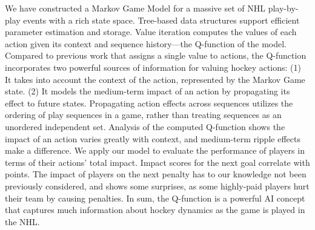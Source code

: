 \documentclass[]{article}
\begin{document}
We have constructed a Markov Game Model for a massive set of NHL play-by-play events with a rich state space. %
Tree-based data structures support efficient parameter estimation and storage. Value iteration computes the values of each action given its context and sequence history---the Q-function of the model. Compared to previous work that assigns a single value to actions, the Q-function incorporates two powerful sources of information for valuing hockey actions: (1) It takes into account the context of the action, represented by the Markov Game state. (2) It models the medium-term impact of an action by propagating its effect to future states. %
Propagating action effects across sequences utilizes the ordering of play sequences in a game, rather than treating sequences as an unordered independent set.
%
Analysis of the computed Q-function shows the impact of an action varies greatly with context, and medium-term ripple effects make a difference. We apply our model to evaluate the performance of players in terms of their actions' total impact.
Impact scores for the next goal correlate with points. The impact of players on the next penalty has to our knowledge
not been previously considered, and shows some surprises, as some highly-paid players hurt their team by causing penalties. %
In sum, the Q-function is a powerful AI concept that captures much information about hockey dynamics as the game is played in the NHL.
\end{document}
